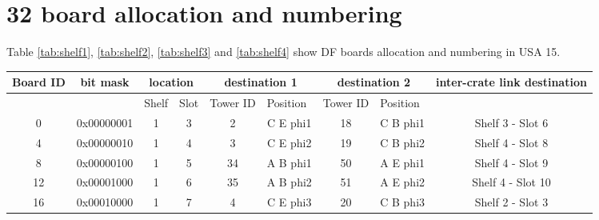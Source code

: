 \documentclass[11pt,letterpaper]{article}
\begin{document}
\section{32 board allocation and numbering}

Table \ref{tab:shelf1}, \ref{tab:shelf2}, \ref{tab:shelf3} and \ref{tab:shelf4} show DF boards allocation and numbering in USA 15. 


\begin{table}[h]
\centering
\tiny
\begin{tabular}{|c|c|c|c|c|c|c|c|c|}
\hline
Board ID               & bit mask              & \multicolumn{2}{c|}{location}                          & \multicolumn{2}{c|}{destination 1}                            & \multicolumn{2}{c|}{destination 2}                            & \multicolumn{1}{c|}{inter-crate link destination} \\ \hline
\multicolumn{1}{|l|}{} & \multicolumn{1}{l|}{} & \multicolumn{1}{l|}{Shelf} & \multicolumn{1}{l|}{Slot} & \multicolumn{1}{l|}{Tower ID} & \multicolumn{1}{l|}{Position} & \multicolumn{1}{l|}{Tower ID} & \multicolumn{1}{l|}{Position} &                                                   \\ \hline
0                      & 0x00000001            & 1                          & 3                         & 2                             & C E phi1                      & 18                            & C B phi1                      & Shelf 3 - Slot 6                                  \\ \hline
4                      & 0x00000010            & 1                          & 4                         & 3                             & C E phi2                      & 19                            & C B phi2                      & Shelf 4 - Slot 8                                  \\ \hline
8                      & 0x00000100            & 1                          & 5                         & 34                            & A B phi1                      & 50                            & A E phi1                      & Shelf 4 - Slot 9                                  \\ \hline
12                     & 0x00001000            & 1                          & 6                         & 35                            & A B phi2                      & 51                            & A E phi2                      & Shelf 4 - Slot 10                                 \\ \hline
16                     & 0x00010000            & 1                          & 7                         & 4                             & C E phi3                      & 20                            & C B phi3                      & Shelf 2 - Slot 3                                  \\ \hline

\end{tabular}
\end{table}
\end{document}
